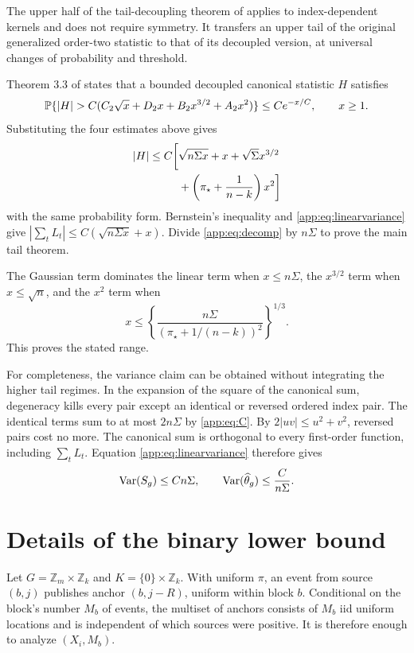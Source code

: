 The upper half of the tail-decoupling theorem of \citet{delapena1995decoupling} applies to index-dependent kernels and does not require symmetry. It transfers an upper tail of the original generalized order-two statistic to that of its decoupled version, at universal changes of probability and threshold.

Theorem 3.3 of \citet{gine2000exponential} states that a bounded decoupled canonical statistic $H$ satisfies
\[
 \Pp\{|H|>C(C_2\sqrt x+D_2x+B_2x^{3/2}+A_2x^2)\}
 \le Ce^{-x/C},\qquad x\ge1.
\]
Substituting the four estimates above gives
\begin{align}
 |H|\le C\bigg[&\sqrt{n\Sigma x}+x+\sqrt\Sigma x^{3/2}\notag\\
 &+\left(\pi_\star+\frac1{n-k}\right)x^2\bigg]
 \label{app:eq:Htail}
\end{align}
with the same probability form. Bernstein's inequality and \eqref{app:eq:linearvariance} give $|\sum_tL_t|\le C(\sqrt{n\Sigma x}+x)$. Divide \eqref{app:eq:decomp} by $n\Sigma$ to prove the main tail theorem.

The Gaussian term dominates the linear term when $x\le n\Sigma$, the $x^{3/2}$ term when $x\le\sqrt n$, and the $x^2$ term when
\[
 x\le\left\{\frac{n\Sigma}{(\pi_\star+1/(n-k))^2}\right\}^{1/3}.
\]
This proves the stated range.

For completeness, the variance claim can be obtained without integrating the higher tail regimes. In the expansion of the square of the canonical sum, degeneracy kills every pair except an identical or reversed ordered index pair. The identical terms sum to at most $2n\Sigma$ by \eqref{app:eq:C}. By $2|uv|\le u^2+v^2$, reversed pairs cost no more. The canonical sum is orthogonal to every first-order function, including $\sum_tL_t$. Equation \eqref{app:eq:linearvariance} therefore gives
\[
 \operatorname{Var}(S_g)\le Cn\Sigma,\qquad
 \operatorname{Var}(\widehat\theta_g)\le\frac{C}{n\Sigma}.
\]

\section{Details of the binary lower bound}

Let $G=\mathbb Z_m\times\mathbb Z_k$ and $K=\{0\}\times\mathbb Z_k$. With uniform $\pi$, an event from source $(b,j)$ publishes anchor $(b,j-R)$, uniform within block $b$. Conditional on the block's number $M_b$ of events, the multiset of anchors consists of $M_b$ iid uniform locations and is independent of which sources were positive. It is therefore enough to analyze $(X_i,M_b)$.

